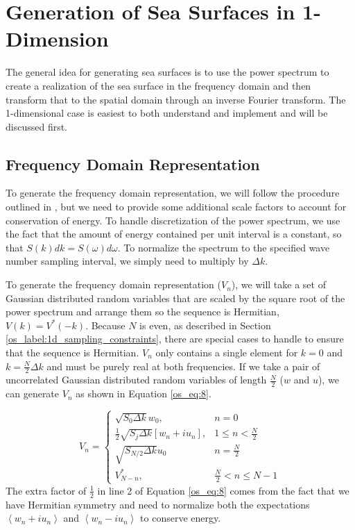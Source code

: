 \section{Generation of Sea Surfaces in 1-Dimension}\label{os_sec:1d}
The general idea for generating sea surfaces is to use the power spectrum to create a realization of the sea surface in the frequency domain and then transform that to the spatial domain through an inverse Fourier transform. The 1-dimensional case is easiest to both understand and implement and will be discussed first.

\subsection{Frequency Domain Representation}
To generate the frequency domain representation, we will follow the procedure outlined in \cite{percival_spectra}, but we need to provide some additional scale factors to account for conservation of energy. To handle discretization of the power spectrum, we use the fact that the amount of energy contained per unit interval is a constant, so that $S(k)dk = S(\omega) d\omega$. To normalize the spectrum to the specified wave number sampling interval, we simply need to multiply by $\Delta k$.

To generate the frequency domain representation ($V_n$), we will take a set of Gaussian distributed random variables that are scaled  by the square root of the power spectrum and arrange them so the sequence is Hermitian, $V(k) = V^*(-k)$. Because $N$ is even, as described in Section \ref{os_label:1d_sampling_constraints}, there are special cases to handle to ensure that the sequence is Hermitian. $V_n$ only contains a single element for $k = 0$ and $k = \frac{N}{2}\Delta k$ and must be purely real at both frequencies. If we take a pair of uncorrelated Gaussian distributed random variables of length $\frac{N}{2}$ ($w$ and $u$), we can generate $V_n$ as shown in Equation \ref{os_eq:8}.

\begin{equation}
  \label{os_eq:8}   
  V_n = \begin{cases}
    \sqrt{S_0\Delta k}w_0, & n = 0 \\
    \frac{1}{2}\sqrt{S_j\Delta k}\left[w_n + iu_n \right], & 1 \leq n < \frac{N}{2} \\
   \sqrt{S_{N/2}\Delta k}u_0 & n = \frac{N}{2} \\
    V_{N-n}^*, &  \frac{N}{2} < n \leq N-1 
  \end{cases} 
\end{equation}
The extra factor of $\frac{1}{2}$ in line 2 of Equation \ref{os_eq:8} comes from the fact that we have Hermitian symmetry and need to normalize both the expectations $\left<w_n + iu_n\right>$ and $\left<w_n - iu_n\right>$ to conserve energy.

